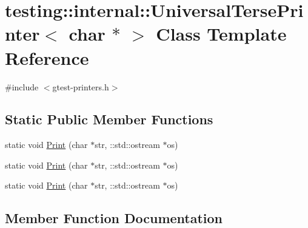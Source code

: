 \hypertarget{classtesting_1_1internal_1_1_universal_terse_printer_3_01char_01_5_01_4}{}\section{testing\+::internal\+::Universal\+Terse\+Printer$<$ char $\ast$ $>$ Class Template Reference}
\label{classtesting_1_1internal_1_1_universal_terse_printer_3_01char_01_5_01_4}


{\ttfamily \#include $<$gtest-\/printers.\+h$>$}

\subsection*{Static Public Member Functions}
\begin{DoxyCompactItemize}
\item 
static void \mbox{\hyperlink{classtesting_1_1internal_1_1_universal_terse_printer_3_01char_01_5_01_4_aa9ef95587c1461fe33e254af52401a43}{Print}} (char $\ast$str, \+::std\+::ostream $\ast$os)
\item 
static void \mbox{\hyperlink{classtesting_1_1internal_1_1_universal_terse_printer_3_01char_01_5_01_4_aa9ef95587c1461fe33e254af52401a43}{Print}} (char $\ast$str, \+::std\+::ostream $\ast$os)
\item 
static void \mbox{\hyperlink{classtesting_1_1internal_1_1_universal_terse_printer_3_01char_01_5_01_4_aa9ef95587c1461fe33e254af52401a43}{Print}} (char $\ast$str, \+::std\+::ostream $\ast$os)
\end{DoxyCompactItemize}


\subsection{Member Function Documentation}
\mbox{\label{classtesting_1_1internal_1_1_universal_terse_printer_3_01char_01_5_01_4_aa9ef95587c1461fe33e254af52401a43}} 
